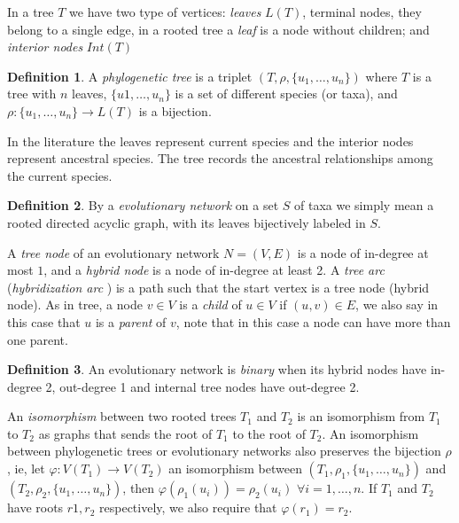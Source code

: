 \documentclass[12pt,a4paper]{book}
\theoremstyle{plain}
\theoremstyle{definition}
\newtheorem{definition}{Definition}
\theoremstyle{remark}
\begin{document}
In a tree $T$ we have two type of vertices: \emph{leaves} $L(T)$, terminal nodes, they belong to a single edge, in a rooted tree a \emph{leaf} 
is a node without children; and \emph{interior nodes} $Int(T)$


\begin{definition}
 A \emph{phylogenetic tree} is a triplet $(T, \rho, \{u_1, \ldots, u_n \} )$ where $T$ is a tree with $n$ leaves, $\{ u1, \ldots, u_n \}$ is a 
set of different species (or taxa), and $\rho: \{u_1, \ldots, u_n \} \rightarrow L(T)$ is a bijection.
\end{definition}

In the literature the leaves represent current species and the interior nodes represent ancestral species. The tree records the ancestral relationships 
among the current species.


\begin{definition} 
By a \emph{evolutionary network} on a set $S$ of taxa we simply mean a rooted directed acyclic graph, with its leaves bijectively labeled 
in $S$. 
\end{definition}

A \emph{tree node} of an evolutionary network $N=(V,E)$ is a node of in-degree at most $1$, and a \emph{hybrid node} is a
 node of in-degree at least 2. A \emph{tree arc} (\emph{hybridization arc} ) is a path such that the start vertex is a tree node (hybrid node). 
As in tree, a node $v\in V$ is a \emph{child} of $u\in V$ if $(u,v) \in E$, we also say in this case that $u$ is a \emph{parent} of $v$, note that 
in this case a node can have more than one parent.

\begin{definition}
 An evolutionary network is \emph{binary} when its hybrid nodes have in-degree 2, out-degree 1 and internal tree nodes have out-degree 2.
\end{definition}

An \emph{isomorphism} between two rooted trees $T_1$ and $T_2$ is an isomorphism from $T_1$ to $T_2$ as graphs that sends the root of $T_1$ to
the root of $T_2$. An isomorphism between phylogenetic trees or evolutionary networks also preserves the bijection $\rho$, ie, let $\varphi: V(T_1) \rightarrow V(T_2)$ an 
isomorphism between $(T_1, \rho_1, \{ u_1, \ldots, u_n \} )$ and $(T_2, \rho_2, \{ u_1, \ldots, u_n \} )$, then $\varphi(\rho_1(u_i))= \rho_2(u_i)$ 
$\forall i = 1, \ldots, n$. If $T_1$ and $T_2$ have roots $r1, r_2$ respectively, we also require that $\varphi(r_1) = r_2$.
\end{document}
